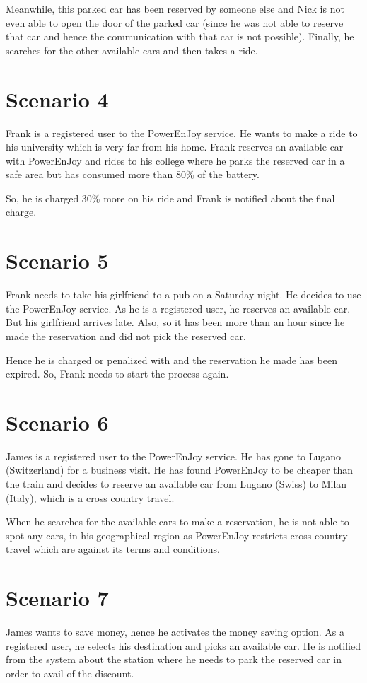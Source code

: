 Meanwhile, this parked car has been reserved by someone else and Nick is not even able to open the door of the parked car (since he was not able to reserve that car and hence the communication with that car is not possible). Finally, he searches for the other available cars and then takes a ride.

\section{Scenario 4}
Frank is a registered user to the PowerEnJoy service. He wants to make a ride to his university which is very far from his home. Frank reserves an available car with PowerEnJoy and rides to his college where he parks the reserved car in a safe area but has consumed more than 80\% of the battery.

So, he is charged 30\% more on his ride and Frank is notified about the final charge.

\section{Scenario 5}
Frank needs to take his girlfriend to a pub on a Saturday night. He decides to use the PowerEnJoy service. As he is a registered user, he reserves an available car. But his girlfriend arrives late. Also, so it has been more than an hour since he made the reservation and did not pick the reserved car.

Hence he is charged or penalized with  and the reservation he made has been expired. So, Frank needs to start the process again.

\section{Scenario 6}
James is a registered user to the PowerEnJoy service. He has gone to Lugano (Switzerland) for a business visit. He has found PowerEnJoy to be cheaper than the train and decides to reserve an available car from Lugano (Swiss) to Milan (Italy), which is a cross country travel.

When he searches for the available cars to make a reservation, he is not able to spot any cars, in his geographical region as PowerEnJoy restricts cross country travel which are against its terms and conditions.

\section{Scenario 7}
James wants to save money, hence he activates the money saving option. As a registered user, he selects his destination and picks an available car. He is notified from the system about the station where he needs to park the reserved car in order to avail of the discount.

